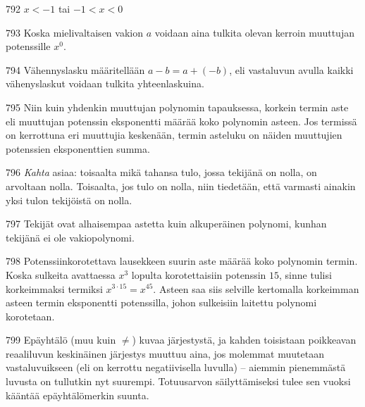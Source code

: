 \begin{Vastaus}{792}
        $x<-1$ tai $ -1<x<0$
    
\end{Vastaus}
\begin{Vastaus}{793}
	Koska mielivaltaisen vakion $a$ voidaan aina tulkita olevan kerroin muuttujan potenssille $x^0$.
	
\end{Vastaus}
\begin{Vastaus}{794}
	Vähennyslasku määritellään $a-b=a+(-b)$, eli vastaluvun avulla kaikki vähenyslaskut voidaan tulkita yhteenlaskuina.
	
\end{Vastaus}
\begin{Vastaus}{795}
	Niin kuin yhdenkin muuttujan polynomin tapauksessa, korkein termin aste eli muuttujan potenssin eksponentti määrää koko polynomin asteen. Jos termissä on kerrottuna eri muuttujia keskenään, termin asteluku on näiden muuttujien potenssien eksponenttien summa.
	
\end{Vastaus}
\begin{Vastaus}{796}
\textit{Kahta} asiaa: toisaalta mikä tahansa tulo, jossa tekijänä on nolla, on arvoltaan nolla. Toisaalta, jos tulo on nolla, niin tiedetään, että varmasti ainakin yksi tulon tekijöistä on nolla.
	
\end{Vastaus}
\begin{Vastaus}{797}
Tekijät ovat alhaisempaa astetta kuin alkuperäinen polynomi, kunhan tekijänä ei ole vakiopolynomi.
	
\end{Vastaus}
\begin{Vastaus}{798}
Potenssiinkorotettava lausekkeen suurin aste määrää koko polynomin termin. Koska sulkeita avattaessa $x^3$ lopulta korotettaisiin potenssin $15$, sinne tulisi korkeimmaksi termiksi $x^{3\cdot 15}=x^{45}$. Asteen saa siis selville kertomalla korkeimman asteen termin eksponentti potenssilla, johon sulkeisiin laitettu polynomi korotetaan.
	
\end{Vastaus}
\begin{Vastaus}{799}
Epäyhtälö (muu kuin $\neq$) kuvaa järjestystä, ja kahden toisistaan poikkeavan reaaliluvun keskinäinen järjestys muuttuu aina, jos molemmat muutetaan vastaluvuikseen (eli on kerrottu negatiivisella luvulla) -- aiemmin pienemmästä luvusta on tullutkin nyt suurempi. Totuusarvon säilyttämiseksi tulee sen vuoksi kääntää epäyhtälömerkin suunta.
	
\end{Vastaus}
